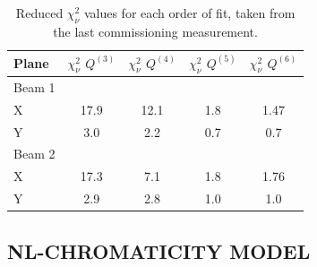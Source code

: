 \begin{table}[tbh]
    \centering
    \begin{tabular}{|l||c|c|c|c|}
    \hline
        Plane     &  $\chi^2_\nu$ $Q^{(3)}$ & $\chi^2_\nu$ $Q^{(4)}$ &  $\chi^2_\nu$ $Q^{(5)}$ &  $\chi^2_\nu$ $Q^{(6)}$  \\ \hline\hline
        Beam 1    &   &   &   & \\
        X         & 17.9  & 12.1 & 1.8 & 1.47 \\               %
        Y         &  3.0  & 2.2  & 0.7 & 0.7 \\ \hline        %
        Beam 2    &    &    &   &\\
        X         & 17.3 & 7.1 & 1.8 & 1.76 \\             %
        Y         & 2.9  & 2.8 & 1.0 & 1.0 \\ \hline      %
    \end{tabular}
    \caption{Reduced $\chi^2_\nu$ values for each order of fit, taken from the last commissioning measurement.}
    \label{table_chisquare}
\end{table}





\subsection{NL-CHROMATICITY MODEL}
\label{sec:nl_chroma_model}

